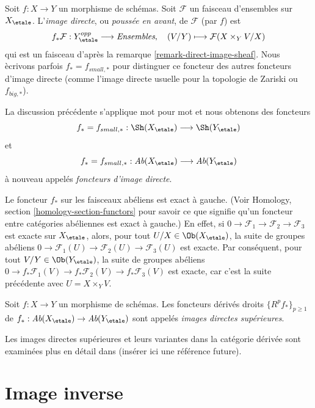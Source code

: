 \begin{definition}
\label{definition-direct-image-sheaf}
Soit $f: X\to Y$ un morphisme de sch\'emas.
Soit $\mathcal{F} $ un faisceau d'ensembles sur $X_\etale$.
L'{\it image directe}, ou {\it pouss\'ee en avant}, de $\mathcal{F}$
(par $f$) est
$$
f_*\mathcal{F} : Y_\etale^{opp} \longrightarrow \textit{Ensembles}, \quad
(V/Y) \longmapsto \mathcal{F}(X \times_Y V/X)
$$
qui est un faisceau d'apr\`es la
remarque \ref{remark-direct-image-sheaf}.
Nous \`ecrivons parfois $f_* = f_{small, *}$ pour distinguer ce foncteur des autres
foncteurs d'image directe (comme l'image directe usuelle pour la topologie de Zariski ou $f_{big, *}$).
\end{definition}

\noindent
La discussion pr\'ec\'edente s'applique mot pour mot et nous obtenons des foncteurs
$$
f_* = f_{small, *} :
\Sh(X_\etale)
\longrightarrow
\Sh(Y_\etale)
$$
et
$$
f_* = f_{small, *} :
\textit{Ab}(X_\etale)
\longrightarrow
\textit{Ab}(Y_\etale)
$$
\`a nouveau appel\'es {\it foncteurs d'image directe}.

\medskip\noindent
Le foncteur $f_*$ sur les faisceaux ab\'eliens est exact \`a gauche. (Voir
Homology, section \ref{homology-section-functors}
pour savoir ce que signifie qu'un foncteur entre cat\'egories ab\'eliennes est exact \`a gauche.)
En effet, si
$0 \to \mathcal{F}_1 \to \mathcal{F}_2 \to \mathcal{F}_3$
est exacte sur $X_\etale$, alors, pour tout
$U/X \in \Ob(X_\etale)$,
la suite de groupes ab\'eliens
$0 \to \mathcal{F}_1(U) \to \mathcal{F}_2(U) \to \mathcal{F}_3(U)$
est exacte. Par cons\'equent, pour tout $V/Y \in \Ob(Y_\etale)$,
la suite de groupes ab\'eliens
$0 \to f_*\mathcal{F}_1(V) \to f_*\mathcal{F}_2(V) \to f_*\mathcal{F}_3(V)$
est exacte, car c'est la suite pr\'ec\'edente avec $U = X \times_Y V$.

\begin{definition}
\label{definition-higher-direct-images}
Soit $f: X \to Y$ un morphisme de sch\'emas.
Les foncteurs d\'eriv\'es droits $\{R^pf_*\}_{p \geq 1}$ de
$f_* : \textit{Ab}(X_\etale) \to \textit{Ab}(Y_\etale)$
sont appel\'es {\it images directes sup\'erieures}.
\end{definition}

\noindent
Les images directes sup\'erieures et leurs variantes dans la cat\'egorie d\'eriv\'ee
sont examin\'ees plus en d\'etail dans (ins\'erer ici une r\'ef\'erence future).



\section{Image inverse}
\label{section-inverse-image}

